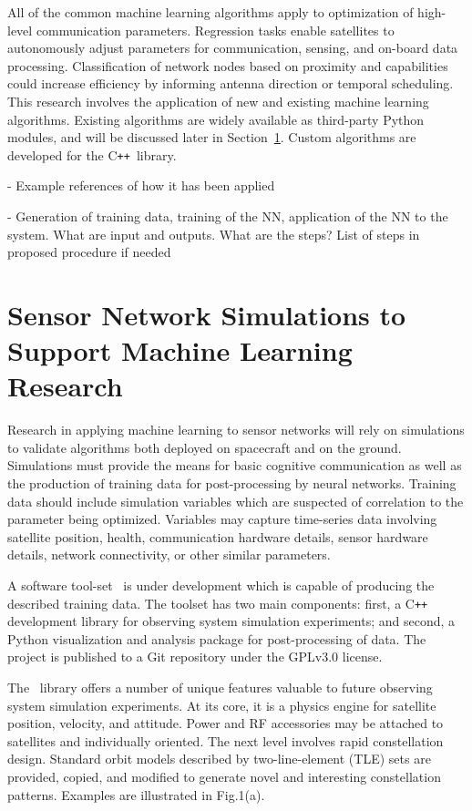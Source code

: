 \documentclass[conference]{IEEEtran}
\newcommand{\project}{{\sc{Collaborate}}~}
\newcommand{\cpp}{C\texttt{++}~}
\begin{document}
All of the common machine learning algorithms apply to optimization of
high-level communication parameters.  Regression tasks enable satellites to
autonomously adjust parameters for communication, sensing, and on-board data
processing.  Classification of network nodes based on proximity and capabilities
could increase efficiency by informing antenna direction or temporal scheduling.
This research involves the application of new and existing machine learning
algorithms.  Existing algorithms are widely available as third-party Python
modules, and will be discussed later in Section~\ref{sec:software}.  Custom
algorithms are developed for the \cpp library.

{
  \color{red}
  - Example references of how it has been applied

  - Generation of training data, training of the NN, application of the NN to
  the system. What are input and outputs. What are the steps? List of steps in
  proposed procedure if needed
}


\section{Sensor Network Simulations to Support Machine Learning Research}
\label{sec:software}

Research in applying machine learning to sensor networks will rely on
simulations to validate algorithms both deployed on spacecraft and on the
ground.  Simulations must provide the means for basic cognitive communication as
well as the production of training data for post-processing by neural networks.
Training data should include simulation variables which are suspected of
correlation to the parameter being optimized.  Variables may capture time-series
data involving satellite position, health, communication hardware details,
sensor hardware details, network connectivity, or other similar parameters.

A software tool-set \project is under development which is capable of producing
the described training data.  The toolset has two main components: first, a \cpp
development library for observing system simulation experiments; and second, a
Python visualization and analysis package for post-processing of data.  The
project is published to a Git repository under the GPLv3.0 license.

The \project library offers a number of unique features valuable to future
observing system simulation experiments.  At its core, it is a physics engine
for satellite position, velocity, and attitude.  Power and RF accessories may be
attached to satellites and individually oriented.  The next level involves rapid
constellation design.  Standard orbit models described by two-line-element (TLE)
sets are provided, copied, and modified to generate novel and interesting
constellation patterns.  Examples are illustrated in Fig.1(a).
\end{document}
